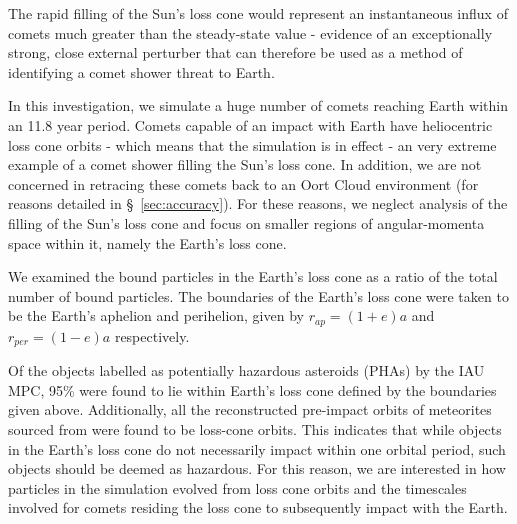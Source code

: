 The rapid filling of the Sun's loss cone would represent an instantaneous influx of comets much greater than the steady-state value - evidence of an exceptionally strong, close external perturber that can therefore be used as a method of identifying a comet shower threat to Earth.

In this investigation, we simulate a huge number of comets reaching Earth within an 11.8 year period. Comets capable of an impact with Earth have heliocentric loss cone orbits - which means that the simulation is in effect - an very extreme example of a comet shower filling the Sun's loss cone. In addition, we are not concerned in retracing these comets back to an Oort Cloud environment (for reasons detailed in \S~\ref{sec:accuracy}). For these reasons, we neglect analysis of the filling of the Sun's loss cone and focus on smaller regions of angular-momenta space within it, namely the Earth's loss cone.


%

We examined the bound particles in the Earth's loss cone as a ratio of the total number of bound particles. The boundaries of the Earth's loss cone were taken to be the Earth's aphelion and perihelion, given by $r_{ap} = (1+e)a$ and $r_{per} = (1-e)a$ respectively.

Of the objects labelled as potentially hazardous asteroids (PHAs) by the IAU MPC, 95\% were found to lie within Earth's loss cone defined by the boundaries given above. Additionally, all the reconstructed pre-impact orbits of meteorites sourced from \cite{doi:10.1093/mnras/stv378} were found to be loss-cone orbits. This indicates that while objects in the Earth's loss cone do not necessarily impact within one orbital period, such objects should be deemed as hazardous. For this reason, we are interested in how particles in the simulation evolved from loss cone orbits and the timescales involved for comets residing the loss cone to subsequently impact with the Earth.

